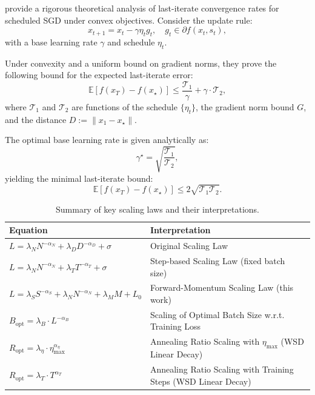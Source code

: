 \documentclass[letterpaper]{article} %
\newcommand{\E}{\mathbb{E}}
\begin{document}
\citet{schaipp2025surprisingagreementconvexoptimization} provide a rigorous theoretical analysis of last-iterate convergence rates for scheduled SGD under convex objectives. Consider the update rule:
\begin{equation}
	x_{t+1} = x_t - \gamma \eta_t g_t, \quad g_t \in \partial f(x_t, s_t),
\end{equation}
with a base learning rate $\gamma$ and schedule $\eta_t$.

Under convexity and a uniform bound on gradient norms, they prove the following bound for the expected last-iterate error:
\begin{equation}
	\E[f(x_T) - f(x_\star)] \leq \frac{\mathcal{T}_1}{\gamma} + \gamma \cdot \mathcal{T}_2,
\end{equation}
where $\mathcal{T}_1$ and $\mathcal{T}_2$ are functions of the schedule $\{\eta_t\}$, the gradient norm bound $G$, and the distance $D := \|x_1 - x_\star\|$.

The optimal base learning rate is given analytically as:
\begin{equation}
	\gamma^\star = \sqrt{\frac{\mathcal{T}_1}{\mathcal{T}_2}},
\end{equation}
yielding the minimal last-iterate bound:
\begin{equation}
	\E[f(x_T) - f(x_\star)] \leq 2 \sqrt{\mathcal{T}_1 \mathcal{T}_2}.
\end{equation}


\begin{table}[h]
	\centering
	\begin{tabular}{@{}ll@{}}
		\toprule
		\textbf{Equation} & \textbf{Interpretation} \\
		\midrule
		$L = \lambda_N N^{-\alpha_N} + \lambda_D D^{-\alpha_D} + \sigma$ & Original Scaling Law~\citep{Kaplan2020ScalingLF, Hoffmann2022TrainingCL} \\
		$L = \lambda_N N^{-\alpha_N} + \lambda_T T^{-\alpha_T} + \sigma$ & Step-based Scaling Law (fixed batch size)~\citep{Kaplan2020ScalingLF} \\
		$L = \lambda_S S^{-\alpha_S} + \lambda_N N^{-\alpha_N} + \lambda_M M + L_0$ & Forward-Momentum Scaling Law (this work) \\
		$B_{\text{opt}} = \lambda_B \cdot L^{-\alpha_B}$ & Scaling of Optimal Batch Size w.r.t. Training Loss \\
		$R_{\text{opt}} = \lambda_\eta \cdot \eta_{\max}^{\alpha_\eta}$ & Annealing Ratio Scaling with $\eta_{\max}$ (WSD Linear Decay) \\
		$R_{\text{opt}} = \lambda_T \cdot T^{\alpha_T}$ & Annealing Ratio Scaling with Training Steps (WSD Linear Decay) \\
		\bottomrule
	\end{tabular}
	\caption{Summary of key scaling laws and their interpretations.}
	\label{tab:scaling_summary}
\end{table}
\end{document}
